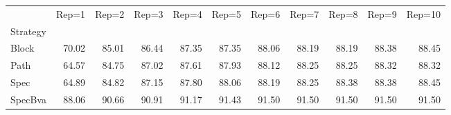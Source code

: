 \begin{tabular}{lrrrrrrrrrr}
\toprule
 & Rep=1 & Rep=2 & Rep=3 & Rep=4 & Rep=5 & Rep=6 & Rep=7 & Rep=8 & Rep=9 & Rep=10 \\
Strategy &  &  &  &  &  &  &  &  &  &  \\
\midrule
Block & 70.02 & 85.01 & 86.44 & 87.35 & 87.35 & 88.06 & 88.19 & 88.19 & 88.38 & 88.45 \\
Path & 64.57 & 84.75 & 87.02 & 87.61 & 87.93 & 88.12 & 88.25 & 88.25 & 88.32 & 88.32 \\
Spec & 64.89 & 84.82 & 87.15 & 87.80 & 88.06 & 88.19 & 88.25 & 88.38 & 88.38 & 88.45 \\
SpecBva & 88.06 & 90.66 & 90.91 & 91.17 & 91.43 & 91.50 & 91.50 & 91.50 & 91.50 & 91.50 \\
\bottomrule
\end{tabular}
